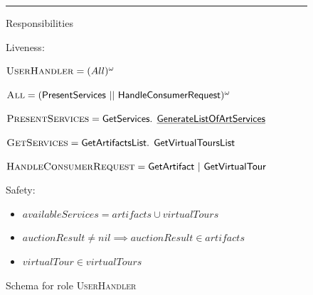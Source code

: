 \documentclass[paper=letter, fontsize=12pt]{article}
\begin{document}
\begin{figure}[H]
\begin{center}
{{\setlength\parindent{14pt} \noindent\rule{15cm}{0.4pt}

\setlength\parindent{14pt} Responsibilities
\par \setlength\parindent{14pt} Liveness:
\par\setlength\parindent{75pt}$\text{\textsc{UserHandler}} = (All)^{\omega}$ 
\par\setlength\parindent{75pt}$\text{\textsc{All}} = (\text{{\fontfamily{\sfdefault}\selectfont 
PresentServices || HandleConsumerRequest}})^{\omega}$
\par\setlength\parindent{75pt}$\text{\textsc{PresentServices}} = \text{{\fontfamily{\sfdefault}\selectfont GetServices. \underline{GenerateListOfArtServices}}}$
\par\setlength\parindent{75pt}$\text{\textsc{GetServices}} = \text{{\fontfamily{\sfdefault}\selectfont GetArtifactsList. GetVirtualToursList}}$
\par\setlength\parindent{75pt}$\text{\textsc{HandleConsumerRequest}} = \text{{\fontfamily{\sfdefault}\selectfont GetArtifact | GetVirtualTour}}$

\par \setlength\parindent{14pt} Safety:
\begin{itemize}[leftmargin=20mm]
\item $availableServices = artifacts \cup virtualTours$
\item $auctionResult \neq nil \implies auctionResult \in artifacts$
\item $virtualTour \in virtualTours$
\end{itemize}
    }%
}
\caption{Schema for role \textsc{UserHandler}}
\label{fig:role_user_handler}
\end{center}
\end{figure}
\end{document}
